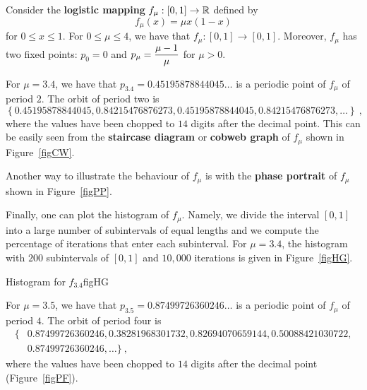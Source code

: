 \begin{egg}
Consider the {\bfseries logistic mapping}
$f_\mu:[0,1] \to \mathbb{R}$ defined by
\[
f_\mu(x) = \mu x(1-x)
\]
for $0\leq x \leq 1$.  For $0 \leq \mu \leq 4$, we have that
$f_\mu:[0,1]\rightarrow [0,1]$.  Moreover, $f_\mu$ has two fixed
points: $p_0 = 0$ and
$\displaystyle p_{\mu} = \frac{\mu-1}{\mu}$ for $\mu > 0$.

For $\mu=3.4$, we have that
$p_{3.4} = 0.45195878844045\ldots$ is a periodic point of
$f_\mu$ of period $2$.  The orbit of period two is
\[
\left\{ 0.45195878844045, 0.84215476876273, 0.45195878844045,
0.84215476876273, \ldots \right\} \ ,
\]
where the values have been chopped
to $14$ digits after the decimal point.  This can be easily seen from the
{\bfseries staircase diagram} or
{\bfseries cobweb graph} of $f_\mu$ shown in
Figure~\ref{figCW}.


Another way to illustrate the behaviour of $f_\mu$ is with the
{\bfseries phase portrait} of $f_\mu$ shown in
Figure~\ref{figPP}.


Finally, one can plot the histogram of $f_\mu$.  Namely, we divide
the interval $[0,1]$ into a large number of subintervals of equal
lengths and we compute the percentage of iterations that enter each
subinterval.  For $\mu=3.4$, the histogram with $200$ subintervals of
$[0,1]$ and $10,000$ iterations is given in Figure~\ref{figHG}.

{Histogram for $f_{3.4}$}{figHG}

For $\mu=3.5$, we have that
$p_{3.5} = 0.87499726360246\ldots$ is a periodic point of
$f_\mu$ of period $4$.  The orbit of period four is
\[
\begin{split}
\big\{ & 0.87499726360246, 0.38281968301732, 0.82694070659144,
  0.50088421030722, \\
& 0.87499726360246, \ldots \big\} \ ,
\end{split}
\]
where the values have been chopped
to $14$ digits after the decimal point (Figure~\ref{figPF}).

\label{EggLogMap1}
\end{egg}

